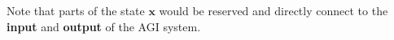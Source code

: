 \documentclass[orivec]{llncs}
\newcommand{\vect}[1]{\boldsymbol{#1}}
\begin{document}
Note that parts of the state $\vect{x}$ would be reserved and directly connect to the \textbf{input} and \textbf{output} of the AGI system.





\end{document}

